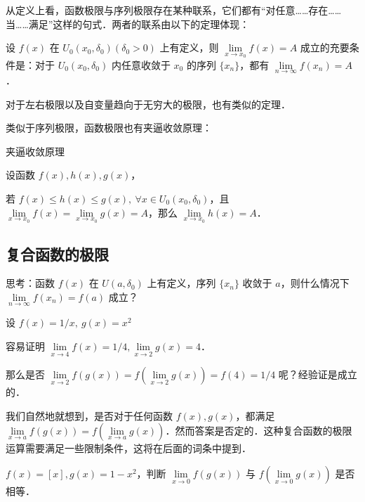从定义上看，函数极限与序列极限存在某种联系，它们都有“对任意……存在……当……满足”这样的句式．两者的联系由以下的定理体现：

\begin{theorem}{}
设 $f(x)$ 在 $U_0(x_0,\delta_0)(\delta_0>0)$ 上有定义，则 $\lim\limits_{x\rightarrow x_0}f(x)=A$ 成立的充要条件是：对于 $U_0(x_0,\delta_0)$ 内任意收敛于 $x_0$ 的序列 $\{x_n\}$，都有 $\lim\limits_{n\rightarrow \infty}f(x_n)=A$．

对于左右极限以及自变量趋向于无穷大的极限，也有类似的定理．
\end{theorem}





类似于序列极限，函数极限也有夹逼收敛原理：
\begin{theorem}{夹逼收敛原理}

  设函数 $f(x),h(x),g(x)$，

  若 $f(x)\le h(x)\le g(x),\ \forall x\in U_0(x_0,\delta_0)$，且 $\lim\limits_{x\rightarrow x_0}f(x)=\lim\limits_{x\rightarrow x_0} g(x)=A$，那么 $\lim\limits_{x\rightarrow x_0}h(x)=A$．
\end{theorem}

\subsection{复合函数的极限}
\begin{exercise}{}
思考：函数 $f(x)$ 在 $U(a,\delta_0)$ 上有定义，序列 $\{x_n\}$ 收敛于 $a$，则什么情况下 $\lim\limits_{n\rightarrow \infty}f(x_n)=f(a)$ 成立？
\end{exercise}
设 $f(x)=1/x,\ g(x)=x^2$

  容易证明 $\lim\limits_{x\rightarrow 4}f(x)=1/4,\lim\limits_{x\rightarrow 2}g(x)=4$．

  那么是否 $\lim\limits_{x\rightarrow 2}f(g(x))=f(\lim\limits_{x\rightarrow 2}g(x))=f(4)=1/4$ 呢？经验证是成立的．

  我们自然地就想到，是否对于任何函数 $f(x),g(x)$，都满足 $\lim\limits_{x\rightarrow a}f(g(x))=f(\lim\limits_{x\rightarrow a}g(x))$．然而答案是否定的．这种复合函数的极限运算需要满足一些限制条件，这将在后面的词条中提到．
\begin{exercise}{}
$f(x)=[x],g(x)=1-x^2$，判断 $\lim\limits_{x\rightarrow 0}f(g(x)) $ 与 $f(\lim\limits_{x\rightarrow 0}g(x))$ 是否相等．
\end{exercise}